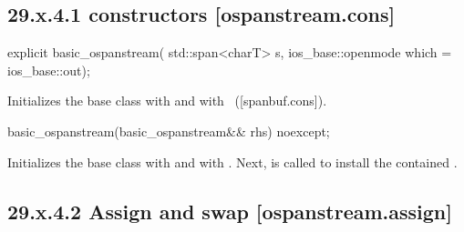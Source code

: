 \documentclass[ebook,11pt,article]{memoir}
\renewcommand{\iref}[1]{[#1]}
\begin{document}

\subsection{29.x.4.1  constructors [ospanstream.cons]}
\label{ospanstream.cons}

\begin{itemdecl}
explicit basic_ospanstream(
  std::span<charT> s,
  ios_base::openmode which = ios_base::out);
\end{itemdecl}

\begin{itemdescr}
\pnum
\effects
Initializes the base class with
and  with
~(\iref{spanbuf.cons}).
\end{itemdescr}

\begin{itemdecl}
basic_ospanstream(basic_ospanstream&& rhs) noexcept;
\end{itemdecl}

\begin{itemdescr}
\pnum
\effects 
Initializes the base class with  
and  with .
Next,  is called to
install the contained .
\end{itemdescr}

\subsection{29.x.4.2 Assign and swap [ospanstream.assign]}
\label{ospanstream.assign}
\end{document}
